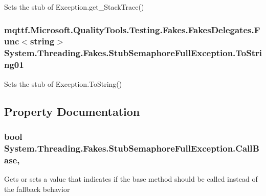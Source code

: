 Sets the stub of Exception.\-get\-\_\-\-Stack\-Trace()

\hypertarget{class_system_1_1_threading_1_1_fakes_1_1_stub_semaphore_full_exception_a216f5c51f8fcd63839b3a7a9a2946803}{
\subsubsection[{To\-String01}]{\setlength{\rightskip}{0pt plus 5cm}mqttf.\-Microsoft.\-Quality\-Tools.\-Testing.\-Fakes.\-Fakes\-Delegates.\-Func$<$string$>$ System.\-Threading.\-Fakes.\-Stub\-Semaphore\-Full\-Exception.\-To\-String01}}\label{class_system_1_1_threading_1_1_fakes_1_1_stub_semaphore_full_exception_a216f5c51f8fcd63839b3a7a9a2946803}


Sets the stub of Exception.\-To\-String()



\subsection{Property Documentation}
\hypertarget{class_system_1_1_threading_1_1_fakes_1_1_stub_semaphore_full_exception_ae9bd3c7429211a3b3c8036b72e4af8f7}{
\subsubsection[{Call\-Base}]{\setlength{\rightskip}{0pt plus 5cm}bool System.\-Threading.\-Fakes.\-Stub\-Semaphore\-Full\-Exception.\-Call\-Base\hspace{0.3cm}{\ttfamily [get]}, {\ttfamily [set]}}}\label{class_system_1_1_threading_1_1_fakes_1_1_stub_semaphore_full_exception_ae9bd3c7429211a3b3c8036b72e4af8f7}


Gets or sets a value that indicates if the base method should be called instead of the fallback behavior

